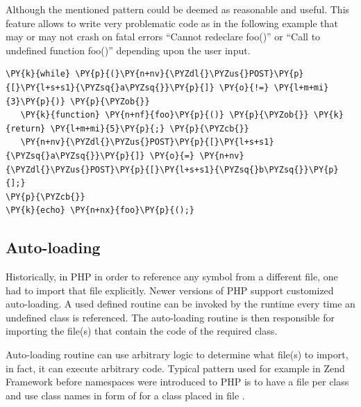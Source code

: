     Although the mentioned pattern could be deemed as 
    reasonable and useful. This feature allows 
    to write very problematic code as in the following example 
    that may or may not crash on fatal errors ``Cannot 
    redeclare foo()'' or ``Call to undefined function foo()'' 
    depending upon the user input.
    
\begin{Verbatim}[commandchars=\\\{\}]
\PY{k}{while} \PY{p}{(}\PY{n+nv}{\PYZdl{}\PYZus{}POST}\PY{p}{[}\PY{l+s+s1}{\PYZsq{}a\PYZsq{}}\PY{p}{]} \PY{o}{!=} \PY{l+m+mi}{3}\PY{p}{)} \PY{p}{\PYZob{}}
   \PY{k}{function} \PY{n+nf}{foo}\PY{p}{()} \PY{p}{\PYZob{}} \PY{k}{return} \PY{l+m+mi}{5}\PY{p}{;} \PY{p}{\PYZcb{}}
   \PY{n+nv}{\PYZdl{}\PYZus{}POST}\PY{p}{[}\PY{l+s+s1}{\PYZsq{}a\PYZsq{}}\PY{p}{]} \PY{o}{=} \PY{n+nv}{\PYZdl{}\PYZus{}POST}\PY{p}{[}\PY{l+s+s1}{\PYZsq{}b\PYZsq{}}\PY{p}{];}
\PY{p}{\PYZcb{}}
\PY{k}{echo} \PY{n+nx}{foo}\PY{p}{();}
\end{Verbatim}
    
                
    \subsection{Auto-loading}
    Historically, in PHP in order to reference any symbol 
    from a different file, one had to import that 
    file explicitly. Newer versions of PHP support  
    customized auto-loading. A used defined routine 
    can be invoked by the runtime every time an 
    undefined class is referenced. 
    The auto-loading routine is then responsible for 
    importing the file(s) that contain the code of the 
    required class. 
    
    Auto-loading routine can use arbitrary logic to 
    determine what file(s) to import, in fact, it can 
    execute arbitrary code. Typical 
    pattern used for example in 
    Zend Framework\cite{zendframework} before namespaces were 
    introduced to PHP is to have a file per class and use 
    class names in form of 
     for 
    a class placed in file 
    .
    
